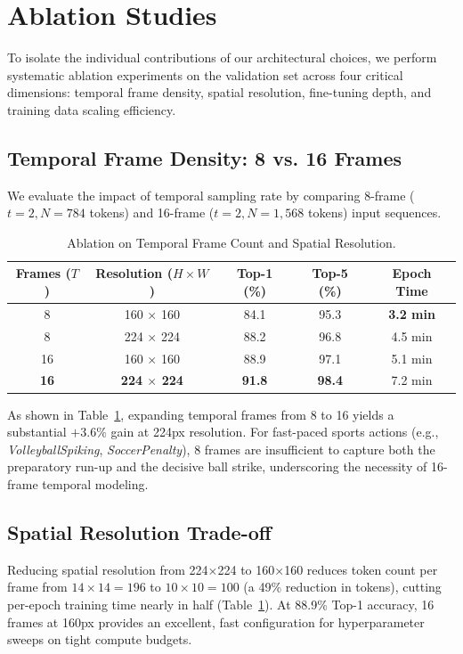 \section{Ablation Studies}
\label{sec:ablation_studies}

To isolate the individual contributions of our architectural choices, we perform systematic ablation experiments on the validation set across four critical dimensions: temporal frame density, spatial resolution, fine-tuning depth, and training data scaling efficiency.

\subsection{Temporal Frame Density: 8 vs. 16 Frames}
We evaluate the impact of temporal sampling rate by comparing 8-frame ($t=2, N=784$ tokens) and 16-frame ($t=2, N=1,568$ tokens) input sequences.

\begin{table}[htbp]
\caption{Ablation on Temporal Frame Count and Spatial Resolution.}
\label{tab:ablation_frames_res}
\centering
\begin{tabular}{ccccc}
\toprule
\textbf{Frames ($T$)} & \textbf{Resolution ($H \times W$)} & \textbf{Top-1 (\%)} & \textbf{Top-5 (\%)} & \textbf{Epoch Time} \\
\midrule
8  & 160 $\times$ 160 & 84.1 & 95.3 & \textbf{3.2 min} \\
8  & 224 $\times$ 224 & 88.2 & 96.8 & 4.5 min \\
16 & 160 $\times$ 160 & 88.9 & 97.1 & 5.1 min \\
\textbf{16} & \textbf{224 $\times$ 224} & \textbf{91.8} & \textbf{98.4} & 7.2 min \\
\bottomrule
\end{tabular}
\end{table}

As shown in Table~\ref{tab:ablation_frames_res}, expanding temporal frames from 8 to 16 yields a substantial $+3.6\%$ gain at 224px resolution. For fast-paced sports actions (e.g., \textit{VolleyballSpiking}, \textit{SoccerPenalty}), 8 frames are insufficient to capture both the preparatory run-up and the decisive ball strike, underscoring the necessity of 16-frame temporal modeling.

\subsection{Spatial Resolution Trade-off}
Reducing spatial resolution from 224$\times$224 to 160$\times$160 reduces token count per frame from $14 \times 14 = 196$ to $10 \times 10 = 100$ (a 49\% reduction in tokens), cutting per-epoch training time nearly in half (Table~\ref{tab:ablation_frames_res}). At 88.9\% Top-1 accuracy, 16 frames at 160px provides an excellent, fast configuration for hyperparameter sweeps on tight compute budgets.

